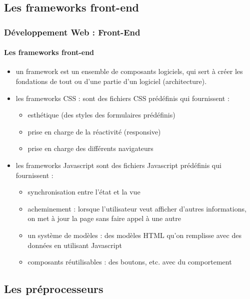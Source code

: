 \documentclass[xcolor=table]{beamer}
\begin{document}
\subsection{Les frameworks front-end}

\begin{frame}
\frametitle{Développement Web : Front-End}
\framesubtitle{Les frameworks front-end}

\begin{itemize}
	\item un framework est un ensemble de composants logiciels, qui sert à créer les fondations de tout ou d'une partie d'un logiciel (architecture). 
	\item les frameworks CSS : sont des fichiers CSS prédéfinis qui fournissent :
	\begin{itemize}
		\item esthétique (des styles des formulaires prédéfinis) 
		\item prise en charge de la réactivité (responsive)
		\item prise en charge des différents navigateurs
	\end{itemize}
	\item les frameworks Javascript sont des fichiers Javascript prédéfinis qui fournissent :
	\begin{itemize}
		\item synchronisation entre l'état et la vue
		\item acheminement : lorsque l'utilisateur veut afficher d'autres informations, on met à jour la page sans faire appel à une autre
		\item un système de modèles : des modèles HTML qu'on remplisse avec des données en utilisant Javascript
		\item composants réutilisables : des boutons, etc. avec du comportement 
	\end{itemize}
\end{itemize}

\end{frame}


\subsection{Les préprocesseurs}
\end{document}
